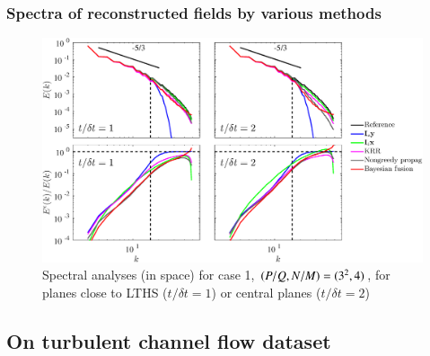 \documentclass{beamer}
\begin{document}
\begin{frame}
\frametitle{Spectra of reconstructed fields by various methods}
	\vspace{-0.25cm}
	\begin{figure}
		\centering
		\includegraphics[width=\textwidth]{./figures/comparisons/isotropic/spectra_sspacing3_tspacing4_spectra2d_sidelegends.eps}
		\vspace{-0.2cm}
		\caption*{Spectral analyses (in space) for case 1, $ (P/Q,N/M) = (3^2,4) $, for planes close to LTHS ($ t/\delta t = 1 $) or central planes ($ t/\delta t = 2 $)}
	\end{figure}
\end{frame}


\subsection[Channel flow]{On turbulent channel flow dataset}
\end{document}
